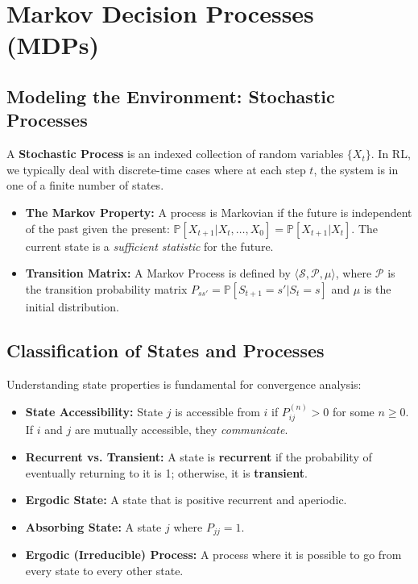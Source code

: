 \section{Markov Decision Processes (MDPs)}

\subsection{Modeling the Environment: Stochastic Processes}
A \textbf{Stochastic Process} is an indexed collection of random variables $\{X_t\}$. In RL, we typically deal with discrete-time cases where at each step $t$, the system is in one of a finite number of states. 
\begin{itemize}
    \item \textbf{The Markov Property:} A process is Markovian if the future is independent of the past given the present: $\mathbb{P}[X_{t+1} | X_t, \dots, X_0] = \mathbb{P}[X_{t+1} | X_t]$. The current state is a \textit{sufficient statistic} for the future.
    \item \textbf{Transition Matrix:} A Markov Process is defined by $\langle \mathcal{S}, \mathcal{P}, \mu \rangle$, where $\mathcal{P}$ is the transition probability matrix $P_{ss'} = \mathbb{P}[S_{t+1}=s' | S_t=s]$ and $\mu$ is the initial distribution.
\end{itemize}

\subsection{Classification of States and Processes}
Understanding state properties is fundamental for convergence analysis:
\begin{itemize}
    \item \textbf{State Accessibility:} State $j$ is accessible from $i$ if $P_{ij}^{(n)} > 0$ for some $n \ge 0$. If $i$ and $j$ are mutually accessible, they \textit{communicate}.
    \item \textbf{Recurrent vs. Transient:} A state is \textbf{recurrent} if the probability of eventually returning to it is 1; otherwise, it is \textbf{transient}.
    \item \textbf{Ergodic State:} A state that is positive recurrent and aperiodic.
    \item \textbf{Absorbing State:} A state $j$ where $P_{jj} = 1$.
    \item \textbf{Ergodic (Irreducible) Process:} A process where it is possible to go from every state to every other state.
\end{itemize}

